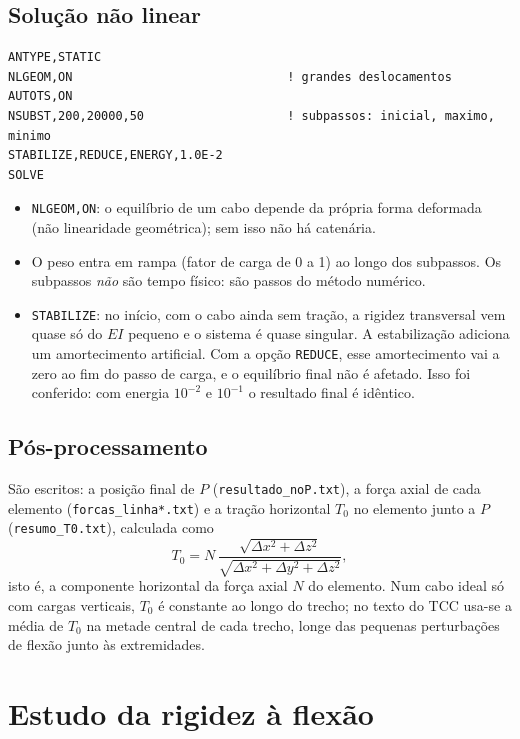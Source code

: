 \documentclass[11pt,a4paper]{article}
\begin{document}
\subsection{Solução não linear}
\begin{lstlisting}[language=APDL]
ANTYPE,STATIC
NLGEOM,ON                              ! grandes deslocamentos
AUTOTS,ON
NSUBST,200,20000,50                    ! subpassos: inicial, maximo, minimo
STABILIZE,REDUCE,ENERGY,1.0E-2
SOLVE
\end{lstlisting}
\begin{itemize}[itemsep=2pt]
  \item \texttt{NLGEOM,ON}: o equilíbrio de um cabo depende da própria forma deformada (não
        linearidade geométrica); sem isso não há catenária.
  \item O peso entra em rampa (fator de carga de 0 a 1) ao longo dos subpassos. Os subpassos
        \emph{não} são tempo físico: são passos do método numérico.
  \item \texttt{STABILIZE}: no início, com o cabo ainda sem tração, a rigidez transversal vem
        quase só do $EI$ pequeno e o sistema é quase singular. A estabilização adiciona um
        amortecimento artificial. Com a opção \texttt{REDUCE}, esse amortecimento vai a zero ao fim
        do passo de carga, e o equilíbrio final não é afetado. Isso foi conferido: com energia
        $10^{-2}$ e $10^{-1}$ o resultado final é idêntico.
\end{itemize}

\subsection{Pós-processamento}
São escritos: a posição final de $P$ (\texttt{resultado\_noP.txt}), a força axial de cada elemento
(\texttt{forcas\_linha*.txt}) e a tração horizontal $T_0$ no elemento junto a $P$
(\texttt{resumo\_T0.txt}), calculada como
\[
T_0 = N\,\frac{\sqrt{\Delta x^2+\Delta z^2}}{\sqrt{\Delta x^2+\Delta y^2+\Delta z^2}},
\]
isto é, a componente horizontal da força axial $N$ do elemento. Num cabo ideal só com cargas
verticais, $T_0$ é constante ao longo do trecho; no texto do TCC usa-se a média de $T_0$ na metade
central de cada trecho, longe das pequenas perturbações de flexão junto às extremidades.

\section{Estudo da rigidez à flexão}\label{sec:estudo}
\end{document}

